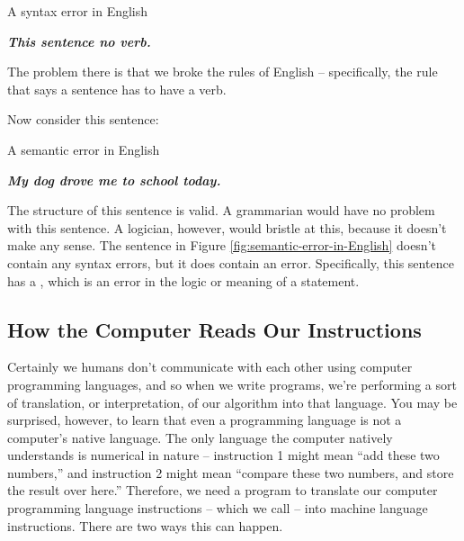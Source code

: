 \begin{myfigure}[label=fig:syntax-error-in-English]{A syntax error in English}
    \begin{tcolorbox}[floatplacement=h,width=\textwidth,colback=black!10]
        \centering
        \textbf{\textit{\large{This sentence no verb.}}}
    \end{tcolorbox}
\end{myfigure}

The problem there is that we broke the rules of English -- specifically, the rule that says a sentence has to have a verb.

Now consider this sentence:

\begin{myfigure}[label=fig:semantic-error-in-English]{A semantic error in English}
    \begin{tcolorbox}[floatplacement=h,width=\textwidth,colback=black!10]
        \centering
        \textbf{\textit{\large{My dog drove me to school today.}}}
    \end{tcolorbox}
\end{myfigure}

The structure of this sentence is valid.  A grammarian would have no problem with this sentence.  A logician, however, would bristle at this, because it doesn't make any sense.  The sentence in Figure \ref{fig:semantic-error-in-English} doesn't contain any syntax errors, but it does contain an error.  Specifically, this sentence has a , which is an error in the logic or meaning of a statement.

\subsection{How the Computer Reads Our Instructions}

Certainly we humans don't communicate with each other using computer programming languages, and so when we write programs, we're performing a sort of translation, or interpretation, of our algorithm into that language.  You may be surprised, however, to learn that even a programming language is not a computer's native language.  The only language the computer natively understands is numerical in nature -- instruction 1 might mean ``add these two numbers,'' and instruction 2 might mean ``compare these two numbers, and store the result over here.''  Therefore, we need a program to translate our computer programming language instructions -- which we call  -- into machine language instructions.  There are two ways this can happen.

